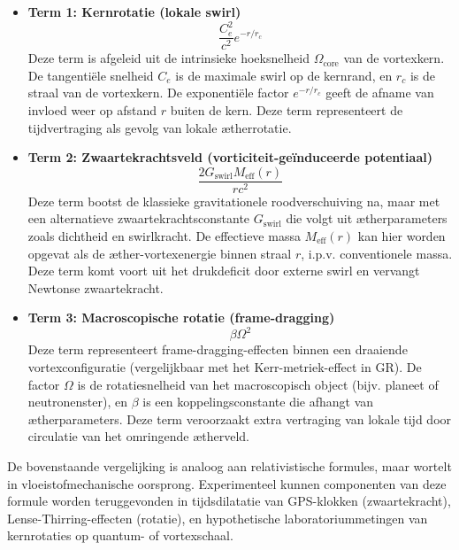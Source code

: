 \begin{itemize}
  \item \textbf{Term 1: Kernrotatie (lokale swirl)}
  \[
  \frac{C_e^2}{c^2} e^{-r/r_c}
  \]
  Deze term is afgeleid uit de intrinsieke hoeksnelheid $\Omega_\text{core}$ van de vortexkern. De tangentiële snelheid $C_e$ is de maximale swirl op de kernrand, en $r_c$ is de straal van de vortexkern. De exponentiële factor $e^{-r/r_c}$ geeft de afname van invloed weer op afstand $r$ buiten de kern. Deze term representeert de tijdvertraging als gevolg van lokale ætherrotatie.

  \item \textbf{Term 2: Zwaartekrachtsveld (vorticiteit-geïnduceerde potentiaal)}
  \[
  \frac{2 G_{\text{swirl}} M_{\text{eff}}(r)}{r c^2}
  \]
  Deze term bootst de klassieke gravitationele roodverschuiving na, maar met een alternatieve zwaartekrachtsconstante $G_{\text{swirl}}$ die volgt uit ætherparameters zoals dichtheid en swirlkracht. De effectieve massa $M_{\text{eff}}(r)$ kan hier worden opgevat als de æther-vortexenergie binnen straal $r$, i.p.v. conventionele massa. Deze term komt voort uit het drukdeficit door externe swirl en vervangt Newtonse zwaartekracht.

  \item \textbf{Term 3: Macroscopische rotatie (frame-dragging)}
  \[
  \beta \Omega^2
  \]
  Deze term representeert frame-dragging-effecten binnen een draaiende vortexconfiguratie (vergelijkbaar met het Kerr-metriek-effect in GR). De factor $\Omega$ is de rotatiesnelheid van het macroscopisch object (bijv. planeet of neutronenster), en $\beta$ is een koppelingsconstante die afhangt van ætherparameters. Deze term veroorzaakt extra vertraging van lokale tijd door circulatie van het omringende ætherveld.

\end{itemize}

De bovenstaande vergelijking is analoog aan relativistische formules, maar wortelt in vloeistofmechanische oorsprong. Experimenteel kunnen componenten van deze formule worden teruggevonden in tijdsdilatatie van GPS-klokken (zwaartekracht), Lense-Thirring-effecten (rotatie), en hypothetische laboratoriummetingen van kernrotaties op quantum- of vortexschaal.

